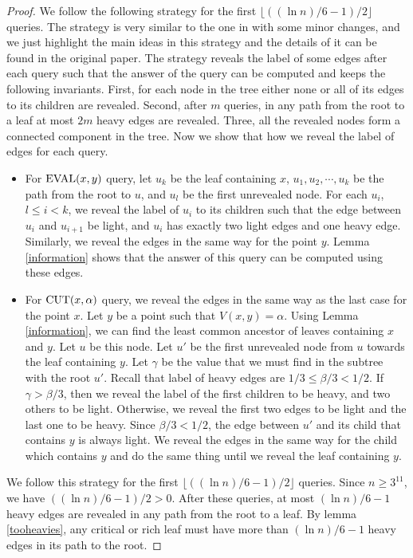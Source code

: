 \begin{proof}
We follow the following strategy for the first $\lfloor ((\ln n)/6 -1)/2 \rfloor$ queries. The strategy is very similar to the one in \cite{edmonds2006cake} with some minor changes, and we just highlight the main ideas in this strategy and the details of it can be found in the original paper. The strategy reveals the label of some edges after each query such that the answer of the query can be computed and keeps the following invariants. First, for each node in the tree either none or all of its edges to its children are revealed. Second, after $m$ queries, in any path from the root to a leaf at most $2m$ heavy edges are revealed. Three, all the revealed nodes form a connected component in the tree. Now we show that how we reveal the label of edges for each query.
\begin{itemize}
\item For ${\operatorname{EVAL}}(x,y)$ query, let $u_k$ be the leaf containing $x$, $u_1, u_2, \cdots, u_k$ be the path from the root to $u$, and $u_l$ be the first unrevealed node. For each $u_i$, $l \le i <k$, we reveal the label of $u_i$ to its children such that the edge between $u_i$ and $u_{i+1}$ be light, and $u_i$ has exactly two light edges and one heavy edge. Similarly, we reveal the edges in the same way for the point $y$.  Lemma \ref{information} shows that the answer of this query can be computed using these edges.
\item For ${\operatorname{CUT}}(x,\alpha)$ query, we reveal the edges in the same way as the last case for the point $x$. Let $y$ be a point such that $V(x,y) = \alpha$. Using Lemma \ref{information}, we can find the least common ancestor of leaves containing $x$ and $y$. Let $u$ be this node. Let $u'$ be the first unrevealed node from $u$ towards the leaf containing $y$. Let $\gamma$ be the value that we must find in the subtree with the root $u'$. Recall that label of heavy edges are $1/3 \le \beta/3 < 1/2$. If $\gamma > \beta/3$, then we reveal the label of the first children to be heavy, and two others to be light. Otherwise, we reveal the first two edges to be light and the last one to be heavy. Since $\beta/3 < 1/2$, the edge between $u'$ and its child that contains $y$ is always light. We reveal the edges in the same way for the child which contains $y$ and do the same thing until we reveal the leaf containing $y$. 
\end{itemize}
We follow this strategy for the first $\lfloor ((\ln n)/6 -1)/2 \rfloor$ queries. Since $n \ge 3^{11}$, we have $((\ln n)/6 -1)/2 >0$. After these queries, at most $(\ln n)/6-1$ heavy edges are revealed in any path from the root to a leaf. By lemma \ref{tooheavies}, any critical or rich leaf must have more than $(\ln n)/6-1$ heavy edges in its path to the root.

\end{proof}
